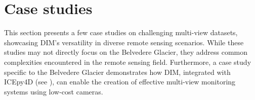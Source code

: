 
\section{Case studies}\label{sec:5:methods}

This section presents a few case studies on challenging multi-view datasets, showcasing DIM's versatility in diverse remote sensing scenarios.
While these studies may not directly focus on the Belvedere Glacier, they address common complexities encountered in the remote sensing field.  
Furthermore, a case study specific to the Belvedere Glacier demonstrates how DIM, integrated with ICEpy4D (see ), can enable the creation of effective multi-view monitoring systems using low-cost cameras.






